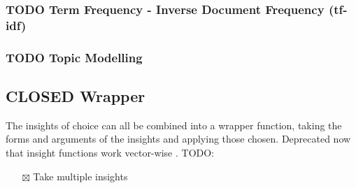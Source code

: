 \documentclass[a4paper, 11pt]{article}
\begin{document}
\subsubsection{{\bfseries\sffamily TODO} Term Frequency - Inverse Document Frequency (tf-idf)}
\label{sec:orgbff36c0}
\subsubsection{{\bfseries\sffamily TODO} Topic Modelling}
\label{sec:org0739af6}
\subsection{{\bfseries\sffamily CLOSED} Wrapper}
\label{sec:orgd401fa3}
The insights of choice can all be combined into a wrapper function,
taking the forms and arguments of the insights and applying those
chosen. Deprecated now that insight functions work vector-wise
.
TODO:
\begin{itemize}
\item[{$\boxtimes$}] Take multiple insights
\end{itemize}
\end{document}
